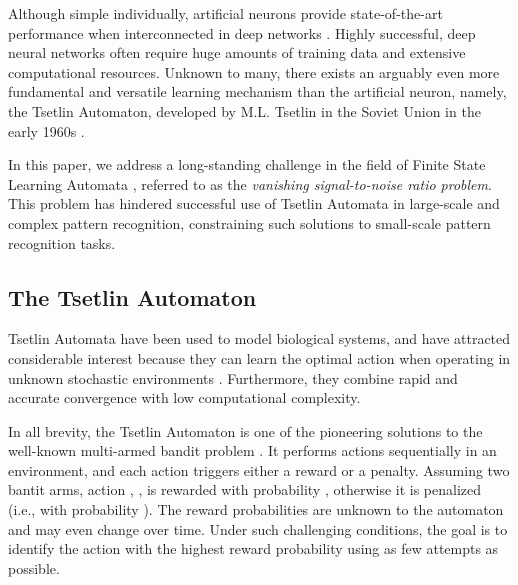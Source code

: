 \documentclass[11pt,a4paper]{article}
\begin{document}
Although simple individually, artificial neurons provide state-of-the-art performance when interconnected in deep networks \cite{LeCun2015}.
Highly successful, deep neural networks often require huge amounts of training data and extensive computational resources. Unknown to many, there exists an arguably even more fundamental and versatile learning mechanism than the artificial neuron, namely, the Tsetlin Automaton, developed by M.L. Tsetlin in the Soviet Union in the early 1960s \cite{Tsetlin1961}.

In this paper, we address a long-standing challenge in the field of Finite State Learning Automata \cite{Narendra1989}, referred to as the \emph{vanishing signal-to-noise ratio problem}. This problem has hindered successful use of Tsetlin Automata in large-scale and complex pattern recognition, constraining such solutions to small-scale pattern recognition tasks.

\subsection{The Tsetlin Automaton}
Tsetlin Automata have been used to model biological systems, and have attracted considerable interest because they can learn the optimal action when operating in unknown stochastic
environments \cite{Tsetlin1961,Narendra1989}. Furthermore, they combine rapid and accurate convergence with low computational complexity.

In all brevity, the Tsetlin Automaton is one of the pioneering solutions to the well-known multi-armed bandit problem \cite{Robbins1952,Gittins1979}. It performs actions sequentially in an environment, and each action triggers either a reward or a penalty. Assuming two bantit arms, action , , is rewarded with probability , otherwise it is penalized (i.e., with probability ). The reward  probabilities are unknown to the automaton and may even change over time. Under such challenging conditions, the goal is to identify the action with the highest reward probability using as few attempts as possible.
\end{document}
